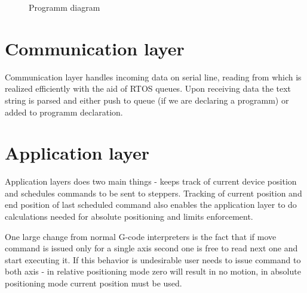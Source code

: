 \begin{figure}[h!]

  \caption[Programm diagram]{Programm diagram}
  \label{fig:code_diag}
\end{figure}

\section{Communication layer}

Communication layer handles incoming data on serial line, reading from which is realized efficiently with the aid of RTOS queues.
Upon receiving data the text string is parsed and either push to queue (if we are declaring a programm) or added to programm declaration.

\section{Application layer}

Application layers does two main things - keeps track of current device position and schedules commands to be sent to steppers.
Tracking of current position and end position of last scheduled command also enables the application layer to do calculations needed for absolute positioning and limits enforcement.

One large change from normal G-code interpreters is the fact that if move command is issued only for a single axis second one is free to read next one and start executing it.
If this behavior is undesirable user needs to issue command to both axis - in relative positioning mode zero will result in no motion, in absolute positioning mode current position must be used.



